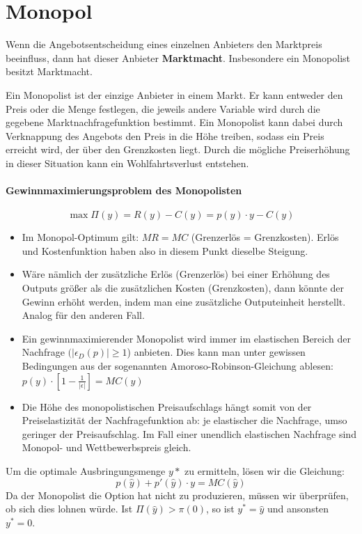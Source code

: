 \chapter{Monopol}

Wenn die Angebotsentscheidung eines einzelnen Anbieters den Marktpreis beeinfluss, dann hat dieser Anbieter \textbf{Marktmacht}. Insbesondere ein Monopolist besitzt Marktmacht. ~\bigskip

Ein Monopolist ist der einzige Anbieter in einem Markt. Er kann entweder den Preis oder die Menge festlegen, die jeweils andere Variable wird durch die gegebene Marktnachfragefunktion bestimmt. Ein Monopolist kann dabei durch Verknappung des Angebots den Preis in die Höhe treiben, sodass ein Preis erreicht wird, der über den Grenzkosten liegt. Durch die mögliche Preiserhöhung in dieser Situation kann ein Wohlfahrtsverlust entstehen.

\subsubsection*{Gewinnmaximierungsproblem des Monopolisten}
$$\max \Pi(y) = R(y) - C(y) = p(y) \cdot y - C(y)$$
\begin{itemize}
	\item Im Monopol-Optimum gilt: $MR = MC$ (Grenzerlös = Grenzkosten). Erlös und Kostenfunktion haben also in diesem Punkt dieselbe Steigung.
	\item Wäre nämlich der zusätzliche Erlös (Grenzerlös) bei einer Erhöhung des Outputs größer als die zusätzlichen Kosten (Grenzkosten), dann könnte der Gewinn erhöht werden, indem man eine zusätzliche Outputeinheit herstellt. Analog für den anderen Fall.
	\item Ein gewinnmaximierender Monopolist wird immer im elastischen Bereich der Nachfrage $(|\epsilon_D(p)| \geq 1$) anbieten. Dies kann man unter gewissen Bedingungen aus der sogenannten Amoroso-Robinson-Gleichung ablesen: $p(y) \cdot \left[ 1 - \frac{1}{|\epsilon|} \right] = MC(y)$
	\item Die Höhe des monopolistischen Preisaufschlags hängt somit von der Preiselastizität der Nachfragefunktion ab: je elastischer die Nachfrage, umso geringer der Preisaufschlag. Im Fall einer unendlich elastischen Nachfrage sind Monopol- und Wettbewerbspreis gleich. 
\end{itemize} 

\begin{kr}[Monopolist]
	Um die optimale Ausbringungsmenge $y*$ zu ermitteln, lösen wir die Gleichung:
		$$ p(\hat{y}) + p'(\hat{y}) \cdot y = MC(\hat{y}) $$	
	Da der Monopolist die Option hat nicht zu produzieren, müssen wir überprüfen, ob sich dies lohnen würde. Ist $\Pi(\hat{y}) > \pi(0)$, so ist $y^* = \hat{y}$ und ansonsten $y^* = 0$.
\end{kr}